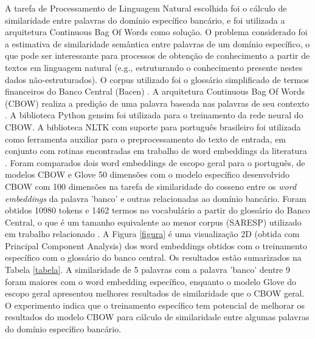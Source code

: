 \documentclass[a4paper,11pt,oneside,onecolumn,final]{article}
\begin{document}
A tarefa de Processamento de Linguagem Natural escolhida foi o cálculo de similaridade entre palavras do domínio específico bancário, e foi utilizada a arquitetura Continuous Bag Of Words como solução.
O problema considerado foi a estimativa de similaridade semântica entre palavras de um domínio específico, o que pode ser interessante para processos de obtenção de conhecimento a partir de textos em linguagem natural (e.g., estruturando o conhecimento presente nestes dados não-estruturados).
O corpus utilizado foi o glossário simplificado de termos financeiros do Banco Central (Bacen) \cite{glossariobacen}.
A arquitetura Continuous Bag Of Words (CBOW) realiza a predição de uma palavra baseada nas palavras de seu contexto \cite{mikolov2013efficient}.
A biblioteca Python gensim \cite{gensim} foi utilizada para o treinamento da rede neural do CBOW.
A biblioteca NLTK \cite{nltk} com suporte para português brasileiro foi utilizada como ferramenta auxiliar para o preprocessamento do texto de entrada, em conjunto com rotinas encontradas em trabalho de word embeddings da literatura \cite{hartmann2017portuguese}.
Foram comparados dois word embeddings de escopo geral para o português, de modelos CBOW e Glove 50 dimensões com o modelo específico desenvolvido CBOW com 100 dimensões na tarefa de similaridade do cosseno entre os \textit{word embeddings} da palavra 'banco' e outras relacionadas ao domínio bancário.
Foram obtidos 10980 tokens e 1462 termos no vocabulário a partir do glossário do Banco Central, o que é um tamanho equivalente ao menor corpus (SARESP) utilizado em trabalho relacionado \cite{hartmann2017portuguese}.
A Figura \ref{figura} é uma visualização 2D (obtida com Principal Component Analysis) dos word embeddings obtidos com o treinamento específico com o glossário do banco central.
Os resultados estão sumarizados na Tabela \ref{tabela}. A similaridade de 5 palavras com a palavra 'banco' dentre 9 foram maiores com o word embedding específico, enquanto o modelo Glove do escopo geral apresentou melhores resultados de similaridade que o CBOW geral.
O experimento indica que o treinamento específico tem potencial de melhorar os resultados do modelo CBOW para cálculo de similaridade entre algumas palavras do domínio específico bancário.
\end{document}
